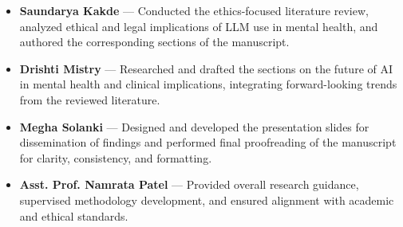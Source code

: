 \documentclass[sn-basic,authoryear]{sn-jnl}
\begin{document}
\begin{itemize}
\begin{itemize}
    \item \textbf{Saundarya Kakde} --- Conducted the ethics-focused literature review, analyzed ethical and legal implications of LLM use in mental health, and authored the corresponding sections of the manuscript.
    
    \item \textbf{Drishti Mistry} --- Researched and drafted the sections on the future of AI in mental health and clinical implications, integrating forward-looking trends from the reviewed literature.
    
    \item \textbf{Megha Solanki} --- Designed and developed the presentation slides for dissemination of findings and performed final proofreading of the manuscript for clarity, consistency, and formatting.
    
    \item \textbf{Asst. Prof. Namrata Patel} --- Provided overall research guidance, supervised methodology development, and ensured alignment with academic and ethical standards.
\end{itemize}
\end{itemize}

\end{document}

